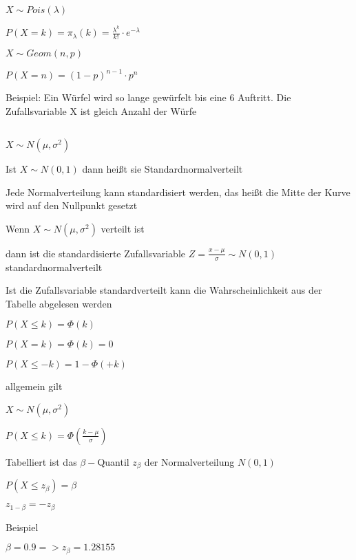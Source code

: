 \documentclass[10pt,a4paper,landscape]{article}
\begin{document}
\begin{multicols*}{4}
\noindent{}
\parbox{\columnwidth}{\centering $X \sim Pois(\lambda)$}
\parbox{\columnwidth}{\centering $P(X = k) = \pi_\lambda(k) = \frac{\lambda^k}{k!} \cdot e^{-\lambda}$}

\noindent{}
\parbox{\columnwidth}{\centering $X \sim Geom(n, p)$}
\parbox{\columnwidth}{\centering $P(X = n) = (1-p)^{n-1} \cdot p^n$}
\parbox{\columnwidth}{\centering Beispiel: Ein Würfel wird so lange gewürfelt bis eine 6 Auftritt. Die Zufallsvariable X ist gleich Anzahl der Würfe}

\subsection{\noindent{}}

\noindent{}
\parbox{\columnwidth}{\centering $X \sim N(\mu, \sigma^2)$}
\parbox{\columnwidth}{\centering Ist $X \sim N(0, 1)$ dann heißt sie Standardnormalverteilt}
\parbox{\columnwidth}{\centering Jede Normalverteilung kann standardisiert werden, das heißt die Mitte der Kurve wird auf den Nullpunkt gesetzt}
\parbox{\columnwidth}{\centering Wenn $X \sim N(\mu, \sigma^2)$ verteilt ist}
\parbox{\columnwidth}{\centering dann ist die standardisierte Zufallsvariable $Z = \frac{x-\mu}{\sigma} \sim N(0,1)$ standardnormalverteilt}
\parbox{\columnwidth}{\centering Ist die Zufallsvariable standardverteilt kann die Wahrscheinlichkeit aus der Tabelle abgelesen werden}
\parbox{\columnwidth}{\centering $P(X \leq k) = \Phi(k)$}
\parbox{\columnwidth}{\centering $P(X = k) = \Phi(k) = 0$}
\parbox{\columnwidth}{\centering $P(X \leq -k) = 1 - \Phi(+k)$}
\parbox{\columnwidth}{\centering allgemein gilt}
\parbox{\columnwidth}{\centering $X \sim N (\mu, \sigma^2)$}
\parbox{\columnwidth}{\centering $P(X \leq k) = \Phi(\frac{k-\mu}{\sigma})$}

\noindent{}
\parbox{\columnwidth}{\centering Tabelliert ist das $\beta-$Quantil $z_\beta$ der Normalverteilung $N(0,1)$}
\parbox{\columnwidth}{\centering $P(X \leq z_\beta) = \beta$}
\parbox{\columnwidth}{\centering $z_{1-\beta} = -z_\beta$}
\parbox{\columnwidth}{\centering Beispiel}
\parbox{\columnwidth}{\centering $\beta = 0.9 => z_\beta = 1.28155$}

\subsection{\noindent{}}

\end{multicols*}
\end{document}
